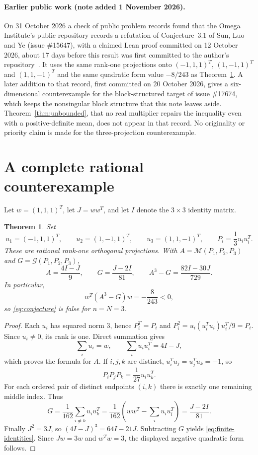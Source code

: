 \documentclass[11pt]{article}
\newtheorem{theorem}{Theorem}
\newcommand{\G}{\mathcal G}
\newcommand{\M}{\mathcal M}
\begin{document}
\paragraph{Earlier public work (note added 1 November 2026).}
On 31 October 2026 a check of public problem records found that the Omega Institute's public repository records a refutation of Conjecture~3.1 of Sun, Luo and Ye (issue \#15647), with a claimed Lean proof committed on 12 October 2026, about 17 days before this result was first committed to the author's repository~\cite{omega15647}. It uses the same rank-one projections onto $(-1,1,1)^T$, $(1,-1,1)^T$ and $(1,1,-1)^T$ and the same quadratic form value $-8/243$ as Theorem~\ref{thm:finite}. A later addition to that record, first committed on 20 October 2026, gives a six-dimensional counterexample for the block-structured target of issue \#17674, which keeps the nonsingular block structure that this note leaves aside. Theorem~\ref{thm:unbounded}, that no real multiplier repairs the inequality even with a positive-definite mean, does not appear in that record. No originality or priority claim is made for the three-projection counterexample.

\section{A complete rational counterexample}

Let $w=(1,1,1)^T$, let $J=ww^T$, and let $I$ denote the $3\times3$ identity matrix.

\begin{theorem}\label{thm:finite}
Set
\[
 u_1=(-1,1,1)^T,\qquad u_2=(1,-1,1)^T,\qquad u_3=(1,1,-1)^T,
 \qquad P_i=\frac13u_i u_i^T.
\]
These are rational rank-one orthogonal projections. With $A=\M(P_1,P_2,P_3)$ and $G=\G(P_1,P_2,P_3)$,
\begin{equation}\label{eq:finite-identities}
 A=\frac{4I-J}{9},\qquad
 G=\frac{J-2I}{81},\qquad
 A^3-G=\frac{82I-30J}{729}.
\end{equation}
In particular,
\[
 w^T(A^3-G)w=-\frac8{243}<0,
\]
so \eqref{eq:conjecture} is false for $n=N=3$.
\end{theorem}

\begin{proof}
Each $u_i$ has squared norm $3$, hence $P_i^T=P_i$ and
$P_i^2=u_i(u_i^Tu_i)u_i^T/9=P_i$. Since $u_i\ne0$, its rank is one.
Direct summation gives
\[
 \sum_i u_i=w,\qquad \sum_i u_i u_i^T=4I-J,
\]
which proves the formula for $A$. If $i,j,k$ are distinct, $u_i^Tu_j=u_j^Tu_k=-1$, so
\[
 P_iP_jP_k=\frac1{27}u_i u_k^T.
\]
For each ordered pair of distinct endpoints $(i,k)$ there is exactly one remaining middle index. Thus
\[
 G=\frac1{162}\sum_{i\ne k}u_i u_k^T
   =\frac1{162}\left(ww^T-\sum_i u_i u_i^T\right)
   =\frac{J-2I}{81}.
\]
Finally $J^2=3J$, so $(4I-J)^3=64I-21J$. Subtracting $G$ yields
\eqref{eq:finite-identities}. Since $Jw=3w$ and $w^Tw=3$, the displayed negative quadratic form follows.
\end{proof}
\end{document}
